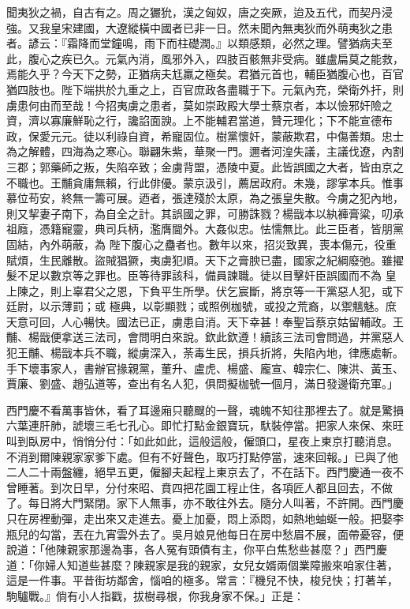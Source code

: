 聞夷狄之禍，自古有之。周之玁狁，漢之匈奴，唐之突厥，迨及五代，而契丹浸強。又我皇宋建國，大遼縱橫中國者已非一日。然未聞內無夷狄而外萌夷狄之患者。諺云：『霜降而堂鐘鳴，雨下而柱礎潤。』以類感類，必然之理。譬猶病夫至此，腹心之疾已久。元氣內消，風邪外入，四肢百骸無非受病。雖盧扁莫之能救，焉能久乎？今天下之勢，正猶病夫尪羸之極矣。君猶元首也，輔臣猶腹心也，百官猶四肢也。陛下端拱於九重之上，百官庶政各盡職于下。元氣內充，榮衛外扞，則虜患何由而至哉！今招夷虜之患者，莫如崇政殿大學士蔡京者，本以憸邪奸險之資，濟以寡廉鮮恥之行，讒諂面諛。上不能輔君當道，贊元理化；下不能宣德布政，保愛元元。徒以利祿自資，希寵固位。樹黨懷奸，蒙蔽欺君，中傷善類。忠士為之解體，四海為之寒心。聯翩朱紫，華聚一門。邇者河湟失議，主議伐遼，內割三郡；郭藥師之叛，失陷卒致；金虜背盟，憑陵中夏。此皆誤國之大者，皆由京之不職也。王黼貪庸無賴，行此俳優。蒙京汲引，薦居政府。未幾，謬掌本兵。惟事慕位苟安，終無一籌可展。迺者，張達殘於太原，為之張皇失散。今虜之犯內地，則又挈妻子南下，為自全之計。其誤國之罪，可勝誅戮？楊戩本以紈褲膏粱，叨承祖廕，憑籍寵靈，典司兵柄，濫膺閫外。大姦似忠。怯懦無比。此三臣者，皆朋黨固結，內外萌蔽，為 陛下腹心之蠱者也。數年以來，招災致異，喪本傷元，役重賦煩，生民離散。盜賊猖獗，夷虜犯順。天下之膏腴已盡，國家之紀綱廢弛。雖擢髮不足以數京等之罪也。臣等待罪該科，備員諫職。徒以目擊奸臣誤國而不為 皇上陳之，則上辜君父之恩，下負平生所學。伏乞宸斷，將京等一干黨惡人犯，或下廷尉，以示薄罰；或 極典，以彰顯戮；或照例枷號，或投之荒裔，以禦魑魅。庶天意可回，人心暢快。國法已正，虜患自消。天下幸甚！奉聖旨蔡京姑留輔政。王黼、楊戩便拿送三法司，會問明白來說。欽此欽遵！續該三法司會問過，并黨惡人犯王黼、楊戩本兵不職，縱虜深入，荼毒生民，損兵折將，失陷內地，律應處斬。手下壞事家人，書辦官掾親黨，董升、盧虎、楊盛、龐宣、韓宗仁、陳洪、黃玉、賈廉、劉盛、趙弘道等，查出有名人犯，俱問擬枷號一個月，滿日發邊衛充軍。」

西門慶不看萬事皆休，看了耳邊廂只聽颼的一聲，魂魄不知往那裡去了。就是驚損六葉連肝肺，諕壞三毛七孔心。即忙打點金銀寶玩，馱裝停當。把家人來保、來旺叫到臥房中，悄悄分付：「如此如此，這般這般，僱頭口，星夜上東京打聽消息。不消到爾陳親家家爹下處。但有不好聲色，取巧打點停當，速來回報。」已與了他二人二十兩盤纏，絕早五更，僱腳夫起程上東京去了，不在話下。西門慶通一夜不曾睡著。到次日早，分付來昭、賁四把花園工程止住，各項匠人都且回去，不做了。每日將大門緊閉。家下人無事，亦不敢往外去。隨分人叫著，不許開。西門慶只在房裡動彈，走出來又走進去。憂上加憂，悶上添悶，如熱地蚰蜒一般。把娶李瓶兒的勾當，丟在九宵雲外去了。吳月娘見他每日在房中愁眉不展，面帶憂容，便說道：「他陳親家那邊為事，各人冤有頭債有主，你平白焦愁些甚麼？」西門慶道：「你婦人知道些甚麼？陳親家是我的親家，女兒女婿兩個業障搬來咱家住著，這是一件事。平昔街坊鄰舍，惱咱的極多。常言：『機兒不快，梭兒快；打著羊，駒驢戰。』倘有小人指戳，拔樹尋根，你我身家不保。」正是：


